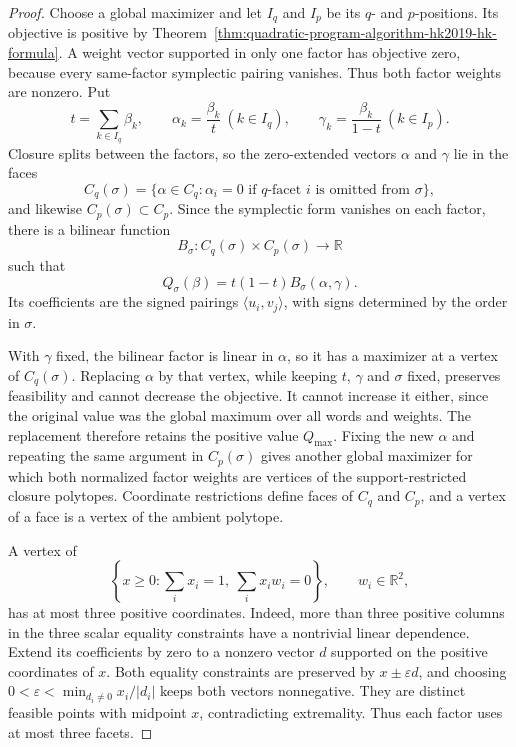 \begin{proof}
Choose a global maximizer and let \(I_q\) and \(I_p\) be its \(q\)- and
\(p\)-positions. Its objective is positive by
Theorem~\ref{thm:quadratic-program-algorithm-hk2019-hk-formula}. A weight vector
supported in only one factor has objective zero, because every same-factor
symplectic pairing vanishes. Thus both factor weights are nonzero. Put
\[
  t=\sum_{k\in I_q}\beta_k,\qquad
  \alpha_k=\frac{\beta_k}{t}\ (k\in I_q),\qquad
  \gamma_k=\frac{\beta_k}{1-t}\ (k\in I_p).
\]
Closure splits between the factors, so the zero-extended vectors \(\alpha\)
and \(\gamma\) lie in the faces
\[
  C_q(\sigma)=\{\alpha\in C_q:\alpha_i=0
    \text{ if \(q\)-facet \(i\) is omitted from \(\sigma\)}\},
\]
and likewise \(C_p(\sigma)\subset C_p\).  Since the symplectic form vanishes
on each factor, there is a bilinear function
\[
  B_\sigma:C_q(\sigma)\times C_p(\sigma)\longrightarrow\mathbb R
\]
such that
\begin{equation}\label{eq:quadratic-program-product-factorization}
  Q_\sigma(\beta)=t(1-t)B_\sigma(\alpha,\gamma).
\end{equation}
Its coefficients are the signed pairings
\(\langle u_i,v_j\rangle\), with signs determined by the order in \(\sigma\).

With \(\gamma\) fixed, the bilinear factor is linear in \(\alpha\),
so it has a maximizer at a vertex of \(C_q(\sigma)\).  Replacing \(\alpha\)
by that vertex, while keeping \(t\), \(\gamma\) and \(\sigma\) fixed, preserves
feasibility and cannot decrease the objective. It cannot increase it either,
since the original value was the global maximum over all words and weights.
The replacement therefore retains the positive value \(Q_{\max}\).
Fixing the new \(\alpha\) and repeating the same argument in
\(C_p(\sigma)\) gives another global maximizer for which
both normalized factor weights are vertices of the support-restricted closure
polytopes.  Coordinate restrictions define faces of \(C_q\) and \(C_p\), and
a vertex of a face is a vertex of the ambient polytope.

A vertex of
\[
  \left\{x\geq0:\sum_i x_i=1,\ \sum_i x_iw_i=0\right\},
  \qquad w_i\in\mathbb{R}^2,
\]
has at most three positive coordinates.  Indeed, more than three positive
columns in the three scalar equality constraints have a nontrivial linear
dependence. Extend its coefficients by zero to a nonzero vector \(d\)
supported on the positive coordinates of \(x\). Both equality constraints
are preserved by \(x\pm\varepsilon d\), and choosing
\(0<\varepsilon<\min_{d_i\ne0}x_i/|d_i|\) keeps both vectors nonnegative.
They are distinct feasible points with midpoint \(x\), contradicting
extremality. Thus each factor uses at most three facets.


\end{proof}
